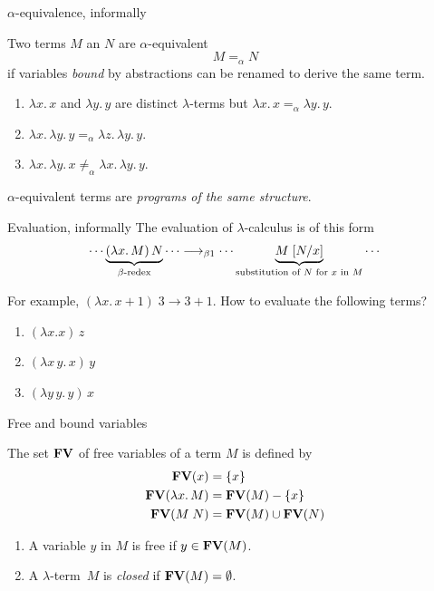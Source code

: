 \begin{frame}{$\alpha$-equivalence, informally}
  \begin{definition}
    Two terms $M$ an $N$ are \alert{$\alpha$-equivalent} 
    \[
      M =_\alpha N
    \]
    if variables \emph{bound} by abstractions can be renamed to derive the same term. 
  \end{definition}
  \begin{example}
    \begin{enumerate}
      \item $\lambda x.\, x$ and $\lambda y.\, y$ are distinct $\lambda$-terms but $\lambda x.\, x
        =_\alpha \lambda y.\, y$. 
      \item $\lambda x.\, \lambda y.\, y =_\alpha 
        \lambda z.\, \lambda y.\, y$. 
      \item $\lambda x.\, \lambda y.\, x \mathrel{\neq}_\alpha
        \lambda x.\, \lambda y.\, y$. 
    \end{enumerate}
  \end{example}
  $\alpha$-equivalent terms are \emph{programs of the same structure}.
  
\end{frame}

\begin{frame}{Evaluation, informally}
  The \alert{evaluation} of $\lambda$-calculus is of this form 
  \[
    \cdots\underbrace{(\lambda x.\, M)\,N}_{\beta\text{-redex}} \cdots \longrightarrow_{\beta 1}
    \cdots \underbrace{M\;[{N}/{x}]}_{\text{substitution of $N$ for $x$ in $M$}} \cdots
  \]

  For example, $(\lambda x.\, x +1)\;3 \to 3 + 1$.
  How to evaluate the following terms? 
  \begin{enumerate}
    \item $(\lambda x.x)\,z$
    \item $(\lambda x\, y.\,x)\,y$
    \item $(\lambda y\, y.\,y)\,x$
  \end{enumerate}
\end{frame}


\begin{frame}{Free and bound variables}
\begin{definition}
  The set $\mathbf{FV}$ of free variables of a term $M$ is defined by
  \begin{align*}
    \mathbf{FV}(x) & = \{x\} \\
    \mathbf{FV}(\lambda x.\, M) & = \mathbf{FV}(M) - \{x\} \\
    \mathbf{FV}(M\;N) & = \mathbf{FV}(M) \cup \mathbf{FV}(N)
  \end{align*}
\end{definition}
\begin{definition}
  \begin{enumerate}
    \item A variable $y$ in $M$ is \alert{free} if $y \in \mathbf{FV}(M)$.
    \item A $\lambda$-term~$M$ is \alert{\emph{closed}} if $\mathbf{FV}(M) = \emptyset$. 
  \end{enumerate}
\end{definition}

\end{frame}

